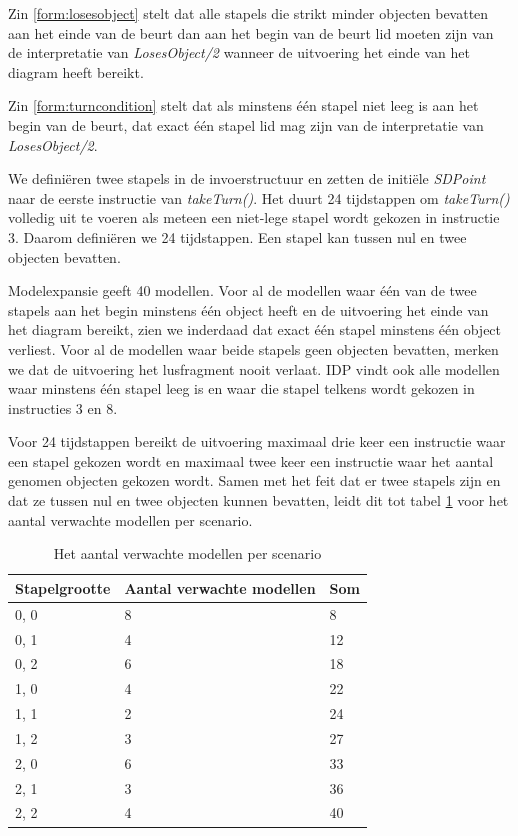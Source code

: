 Zin \ref{form:losesobject} stelt dat alle stapels die strikt minder objecten bevatten aan het einde van de beurt dan aan het begin van de beurt lid moeten zijn van de interpretatie van \textit{LosesObject/2} wanneer de uitvoering het einde van het diagram heeft bereikt.

Zin \ref{form:turncondition} stelt dat als minstens \'e\'en stapel niet leeg is aan het begin van de beurt, dat exact \'e\'en stapel lid mag zijn van de interpretatie van \textit{LosesObject/2}.

We defini\"eren twee stapels in de invoerstructuur en zetten de initi\"ele \textit{SDPoint} naar de eerste instructie van \textit{takeTurn()}. Het duurt 24 tijdstappen om \textit{takeTurn()} volledig uit te voeren als meteen een niet-lege stapel wordt gekozen in instructie 3. Daarom defini\"eren we 24 tijdstappen. Een stapel kan tussen nul en twee objecten bevatten.

Modelexpansie geeft 40 modellen. Voor al de modellen waar \'e\'en van de twee stapels aan het begin minstens \'e\'en object heeft en de uitvoering het einde van het diagram bereikt, zien we inderdaad dat exact \'e\'en stapel minstens \'e\'en object verliest. Voor al de modellen waar beide stapels geen objecten bevatten, merken we dat de uitvoering het lusfragment nooit verlaat. IDP vindt ook alle modellen waar minstens \'e\'en stapel leeg is en waar die stapel telkens wordt gekozen in instructies 3 en 8. 

Voor 24 tijdstappen bereikt de uitvoering maximaal drie keer een instructie waar een stapel gekozen wordt en maximaal twee keer een instructie waar het aantal genomen objecten gekozen wordt. Samen met het feit dat er twee stapels zijn en dat ze tussen nul en twee objecten kunnen bevatten, leidt dit tot tabel \ref{tbl:exp-models} voor het aantal verwachte modellen per scenario.

\begin{table}[]
	\centering
	\begin{tabular}{|l|l|l|}
\hline
Stapelgrootte & Aantal verwachte modellen & Som \\ \hline
0, 0          & 8                         & 8   \\ \hline
0, 1          & 4                         & 12  \\ \hline
0, 2          & 6                         & 18  \\ \hline
1, 0          & 4                         & 22  \\ \hline
1, 1          & 2                         & 24  \\ \hline
1, 2          & 3                         & 27  \\ \hline
2, 0          & 6                         & 33  \\ \hline
2, 1          & 3                         & 36  \\ \hline
2, 2          & 4                         & 40  \\ \hline
\end{tabular}
	\caption{Het aantal verwachte modellen per scenario}
	\label{tbl:exp-models}
\end{table}


